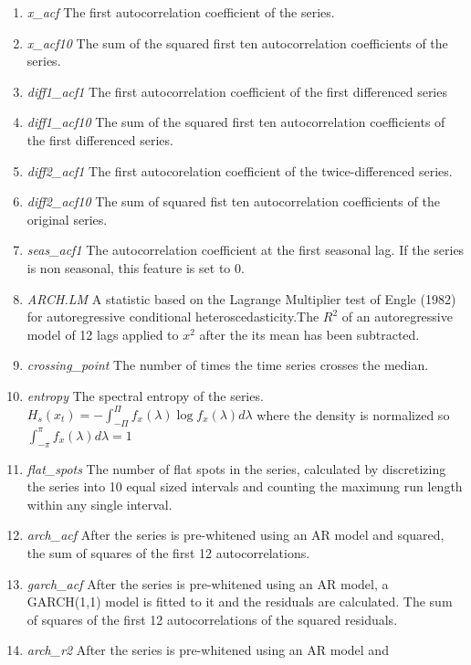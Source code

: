 \documentclass[11pt,a4paper,]{article}
\providecommand{\tightlist}{%
  \setlength{\itemsep}{0pt}\setlength{\parskip}{0pt}}
\theoremstyle{definition}
\theoremstyle{definition}
\theoremstyle{definition}
\theoremstyle{remark}
\begin{document}
\begin{enumerate}
\def\labelenumi{\arabic{enumi}.}
\tightlist
\item
  \emph{x\_acf} The first autocorrelation coefficient of the series.
\item
  \emph{x\_acf10} The sum of the squared first ten autocorrelation
  coefficients of the series.
\item
  \emph{diff1\_acf1} The first autocorrelation coefficient of the first
  differenced series
\item
  \emph{diff1\_acf10} The sum of the squared first ten autocorrelation
  coefficients of the first differenced series.
\item
  \emph{diff2\_acf1} The first autocorelation coefficient of the
  twice-differenced series.
\item
  \emph{diff2\_acf10} The sum of squared fist ten autocorrelation
  coefficients of the original series.
\item
  \emph{seas\_acf1} The autocorrelation coefficient at the first
  seasonal lag. If the series is non seasonal, this feature is set to 0.
\item
  \emph{ARCH.LM} A statistic based on the Lagrange Multiplier test of
  Engle (1982) for autoregressive conditional heteroscedasticity.The
  \(R^2\) of an autoregressive model of 12 lags applied to \(x^2\) after
  the its mean has been subtracted.
\item
  \emph{crossing\_point} The number of times the time series crosses the
  median.
\item
  \emph{entropy} The spectral entropy of the series.
  \(H_s(x_t) = - \int_{-\Pi}^{\Pi} f_x(\lambda) \log f_x(\lambda) d\lambda\)
  where the density is normalized so
  \(\int_{-\pi}^{\pi} f_x(\lambda) d\lambda = 1\)
\item
  \emph{flat\_spots} The number of flat spots in the series, calculated
  by discretizing the series into 10 equal sized intervals and counting
  the maximung run length within any single interval.
\item
  \emph{arch\_acf} After the series is pre-whitened using an AR model
  and squared, the sum of squares of the first 12 autocorrelations.
\item
  \emph{garch\_acf} After the series is pre-whitened using an AR model,
  a GARCH(1,1) model is fitted to it and the residuals are calculated.
  The sum of squares of the first 12 autocorrelations of the squared
  residuals.
\item
  \emph{arch\_r2} After the series is pre-whitened using an AR model and

\end{enumerate}
\end{document}
